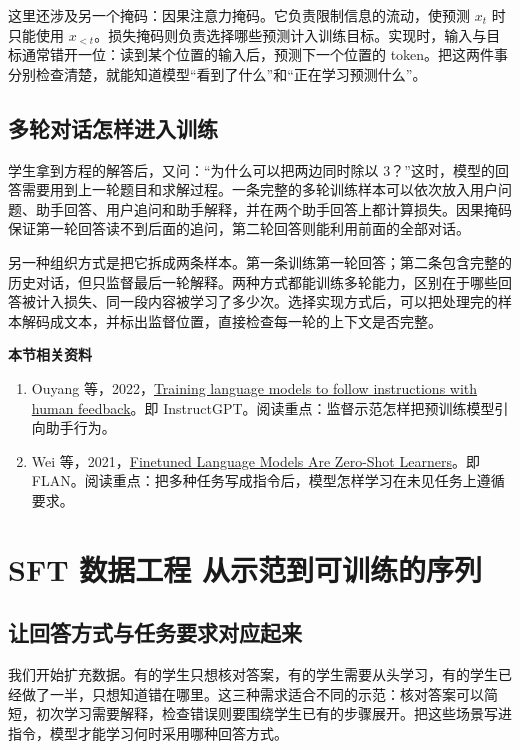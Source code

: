 这里还涉及另一个掩码：因果注意力掩码。它负责限制信息的流动，使预测 $x_t$ 时只能使用 $x_{<t}$。损失掩码则负责选择哪些预测计入训练目标。实现时，输入与目标通常错开一位：读到某个位置的输入后，预测下一个位置的 token。把这两件事分别检查清楚，就能知道模型“看到了什么”和“正在学习预测什么”。

\subsection{多轮对话怎样进入训练}

学生拿到方程的解答后，又问：“为什么可以把两边同时除以 3？”这时，模型的回答需要用到上一轮题目和求解过程。一条完整的多轮训练样本可以依次放入用户问题、助手回答、用户追问和助手解释，并在两个助手回答上都计算损失。因果掩码保证第一轮回答读不到后面的追问，第二轮回答则能利用前面的全部对话。

另一种组织方式是把它拆成两条样本。第一条训练第一轮回答；第二条包含完整的历史对话，但只监督最后一轮解释。两种方式都能训练多轮能力，区别在于哪些回答被计入损失、同一段内容被学习了多少次。选择实现方式后，可以把处理完的样本解码成文本，并标出监督位置，直接检查每一轮的上下文是否完整。

\textbf{本节相关资料}
\begin{enumerate}
    \item Ouyang 等，2022，\href{https://arxiv.org/abs/2203.02155}{Training language models to follow instructions with human feedback}。即 InstructGPT。阅读重点：监督示范怎样把预训练模型引向助手行为。
    \item Wei 等，2021，\href{https://arxiv.org/abs/2109.01652}{Finetuned Language Models Are Zero-Shot Learners}。即 FLAN。阅读重点：把多种任务写成指令后，模型怎样学习在未见任务上遵循要求。
\end{enumerate}

\section{SFT 数据工程 从示范到可训练的序列}\label{SFT 数据工程 模板与监督位置}

\subsection{让回答方式与任务要求对应起来}

我们开始扩充数据。有的学生只想核对答案，有的学生需要从头学习，有的学生已经做了一半，只想知道错在哪里。这三种需求适合不同的示范：核对答案可以简短，初次学习需要解释，检查错误则要围绕学生已有的步骤展开。把这些场景写进指令，模型才能学习何时采用哪种回答方式。

